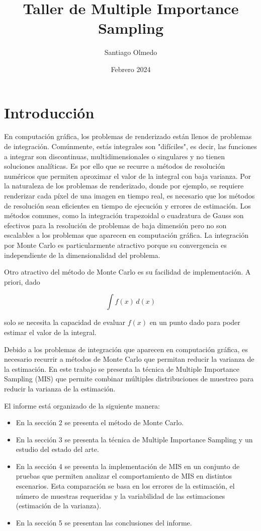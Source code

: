 \documentclass{article}
\title{Taller de Multiple Importance Sampling}
\author{Santiago Olmedo}
\date{Febrero 2024}
\begin{document}
\maketitle

\section{Introducción}

En computación gráfica, los problemas de renderizado están llenos de problemas de integración.
Comúnmente, estás integrales son "difíciles", es decir, las funciones a integrar son discontinuas, multidimensionales o singulares y no tienen soluciones analíticas.
Es por ello que se recurre a métodos de resolución numéricos que permiten aproximar el valor de la integral con baja varianza.
Por la naturaleza de los problemas de renderizado, donde por ejemplo, se requiere renderizar cada píxel de una imagen en tiempo real, es necesario que los métodos de resolución sean eficientes en tiempo de ejecución y errores de estimación.
Los métodos comunes, como la integración trapezoidal o cuadratura de Gauss son efectivos para la resolución de problemas de baja dimensión pero no son escalables a los problemas que aparecen en computación gráfica.
La integración por Monte Carlo es particularmente atractivo porque su convergencia es independiente de la dimensionalidad del problema.

Otro atractivo del método de Monte Carlo es su facilidad de implementación. A priori, dado

$$ \int f(x) \,d(x)$$

solo se necesita la capacidad de evaluar $f(x)$ en un punto dado para poder estimar el valor de la integral.

Debido a los problemas de integración que aparecen en computación gráfica, es necesario recurrir a métodos de Monte Carlo que permitan reducir la varianza de la estimación.
En este trabajo se presenta la técnica de Multiple Importance Sampling (MIS) que permite combinar múltiples distribuciones de muestreo para reducir la varianza de la estimación.

El informe está organizado de la siguiente manera:
\begin{itemize}
\item En la sección 2 se presenta el método de Monte Carlo.
\item En la sección 3 se presenta la técnica de Multiple Importance Sampling y un estudio del estado del arte.
\item En la sección 4 se presenta la implementación de MIS en un conjunto de pruebas que permiten analizar el comportamiento de MIS en distintos escenarios.
Esta comparación se basa en los errores de la estimación, el número de muestras requeridas y la variabilidad de las estimaciones (estimación de la varianza).
\item En la sección 5 se presentan las conclusiones del informe.
\end{itemize}
\end{document}
